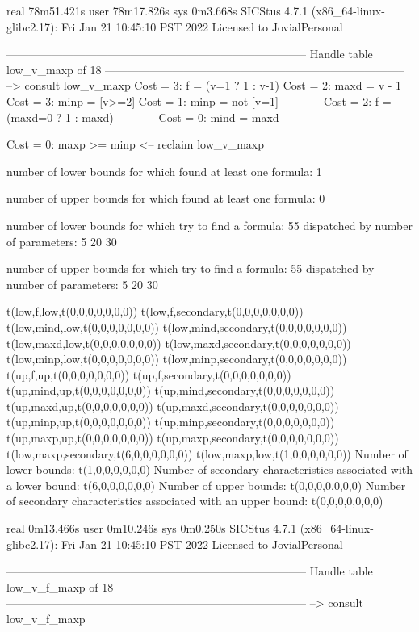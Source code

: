 real	78m51.421s
user	78m17.826s
sys	0m3.668s
SICStus 4.7.1 (x86_64-linux-glibc2.17): Fri Jan 21 10:45:10 PST 2022
Licensed to JovialPersonal


--------------------------------------------------------------------------------
Handle table low_v_maxp of 18
--------------------------------------------------------------------------------
--> consult low_v_maxp
Cost =  3:  f    = (v=1 ? 1 : v-1)
Cost =  2:  maxd = v - 1
Cost =  3:  minp = [v>=2]
Cost =  1:  minp = not [v=1]
----------
Cost =  2:  f    = (maxd=0 ? 1 : maxd)
----------
Cost =  0:  mind = maxd
----------

Cost =  0:  maxp >= minp
<-- reclaim low_v_maxp

number of lower bounds for which found at least one formula: 1

number of upper bounds for which found at least one formula: 0

number of lower bounds for which try to find a formula: 55
dispatched by number of parameters: 5  20  30

number of upper bounds for which try to find a formula: 55
dispatched by number of parameters: 5  20  30

t(low,f,low,t(0,0,0,0,0,0,0))
t(low,f,secondary,t(0,0,0,0,0,0,0))
t(low,mind,low,t(0,0,0,0,0,0,0))
t(low,mind,secondary,t(0,0,0,0,0,0,0))
t(low,maxd,low,t(0,0,0,0,0,0,0))
t(low,maxd,secondary,t(0,0,0,0,0,0,0))
t(low,minp,low,t(0,0,0,0,0,0,0))
t(low,minp,secondary,t(0,0,0,0,0,0,0))
t(up,f,up,t(0,0,0,0,0,0,0))
t(up,f,secondary,t(0,0,0,0,0,0,0))
t(up,mind,up,t(0,0,0,0,0,0,0))
t(up,mind,secondary,t(0,0,0,0,0,0,0))
t(up,maxd,up,t(0,0,0,0,0,0,0))
t(up,maxd,secondary,t(0,0,0,0,0,0,0))
t(up,minp,up,t(0,0,0,0,0,0,0))
t(up,minp,secondary,t(0,0,0,0,0,0,0))
t(up,maxp,up,t(0,0,0,0,0,0,0))
t(up,maxp,secondary,t(0,0,0,0,0,0,0))
t(low,maxp,secondary,t(6,0,0,0,0,0,0))
t(low,maxp,low,t(1,0,0,0,0,0,0))
Number of lower bounds:                                             t(1,0,0,0,0,0,0)
Number of secondary characteristics associated with a lower bound:  t(6,0,0,0,0,0,0)
Number of upper bounds:                                             t(0,0,0,0,0,0,0)
Number of secondary characteristics associated with an upper bound: t(0,0,0,0,0,0,0)

real	0m13.466s
user	0m10.246s
sys	0m0.250s
SICStus 4.7.1 (x86_64-linux-glibc2.17): Fri Jan 21 10:45:10 PST 2022
Licensed to JovialPersonal


--------------------------------------------------------------------------------
Handle table low_v_f_maxp of 18
--------------------------------------------------------------------------------
--> consult low_v_f_maxp

